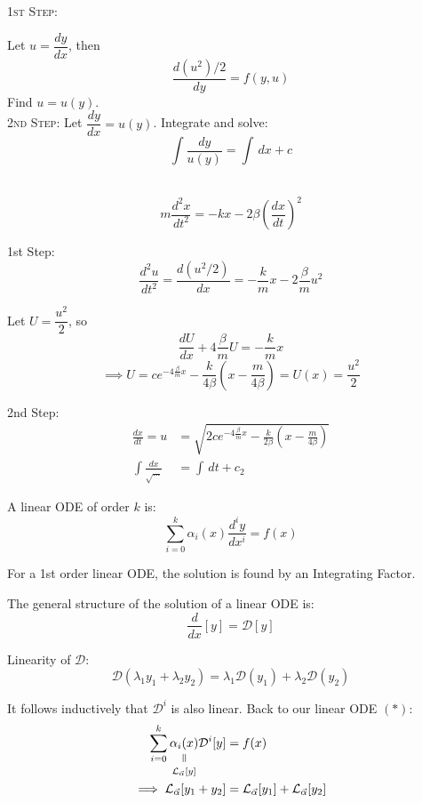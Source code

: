 \documentclass[10pt]{scrartcl}
\begin{document}

\textsc{1st Step:}

Let $u = \dfrac{dy}{dx}$, then 
\[\frac{d(u^2)/2}{dy} = f(y,u)\]
Find $u = u(y)$.\\

\textsc{2nd Step:}
Let $\dfrac{dy}{dx} = u(y)$. Integrate and solve:
\[\int \frac{dy}{u(y)} = \int\,dx + c\]~

\begin{example}[Spring]
	\[m\frac{d^2x}{dt^2} = -kx - 2\beta\left(\frac{dx}{dt}\right)^2\]
	
	1st Step: 
	\[\frac{d^2u}{dt^2} = \frac{d(u^2/2)}{dx} = -\frac{k}{m}x - 2\frac{\beta}{m}u^2\]
	
	Let $U = \dfrac{u^2}{2}$, so 
	\[\frac{dU}{dx} + 4\frac{\beta}{m}U = -\frac{k}{m}x\]
	\[\implies U = ce^{-4\frac{\beta}{m}x} - \frac{k}{4\beta}\left(x - \frac{m}{4\beta}\right) = U(x) = \frac{u^2}{2}\]

	2nd Step: 
	\[
\begin{aligned}
  \frac{dx}{dt} = u &= \sqrt{2ce^{-4\frac{\beta}{m}x} - \frac{k}{2\beta}\left(x-\frac{m}{4\beta}\right)}\\
  \int \frac{dx}{\sqrt{\dots}} &= \int \,dt + c_2
\end{aligned}
\]
\end{example}





A linear ODE of order $k$ is:
\[\sum_{i=0}^k \alpha_i(x) \frac{d^iy}{dx^i} = f(x) \tag{$*$}\]

For a 1st order linear ODE, the solution is found by an Integrating Factor. 

The general structure of the solution of a linear ODE is: 
\[\frac{d}{dx}[y] = \mathcal{D}[y]\]

Linearity of $\mathcal{D}$:
\[\mathcal{D}(\lambda_1y_1 + \lambda_2y_2) = \lambda_1\mathcal{D}(y_1) +\lambda_2\mathcal{D}(y_2)\]

It follows inductively that $\mathcal{D}^i$ is also linear. Back to our linear ODE $(*)$: 
\[
\begin{aligned}
  \sum_{i=0}^k \equalto{\alpha_i(x)}{\mathcal{L}_{\vec{\alpha}}[y]}\mathcal{D}^i[y] &= f(x)\\
  \implies \mathcal{L}_{\vec{\alpha}}[y_1 + y_2] &= \mathcal{L}_{\vec{\alpha}}[y_1] + \mathcal{L}_{\vec{\alpha}}[y_2]
\end{aligned}
\]
\end{document}
